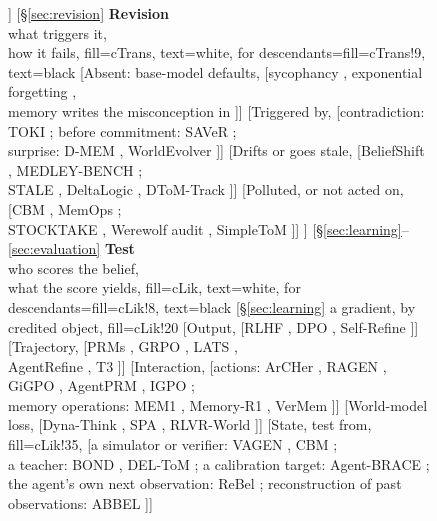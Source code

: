 \begin{figure}[t]
{{  ]
  [{\S\ref*{sec:revision} \textbf{Revision}\\what triggers it,\\how it fails}, fill=cTrans, text=white, for descendants={fill=cTrans!9, text=black}
    [{Absent: base-model defaults}, [{sycophancy \citep{sharma2023towards,atwell2025basil}, exponential forgetting \citep{zhang2025large},\\memory writes the misconception in \citep{bensal2026recalling}}]]
    [{Triggered by}, [{contradiction: TOKI \citep{wang2026toki}; before commitment: SAVeR \citep{yuan2026verify};\\surprise: D-MEM \citep{song2026d}, WorldEvolver \citep{zhang2026selfevolvingx}}]]
    [{Drifts or goes stale}, [{BeliefShift \citep{myakala2026beliefshift}, MEDLEY-BENCH \citep{abtahi2026medleybench};\\STALE \citep{chao2026stale}, DeltaLogic \citep{dhanda2026deltalogic}, DToM-Track \citep{nguyen2026dynamic}}]]
    [{Polluted, or not acted on}, [{CBM \citep{xu2026should}, MemOps \citep{hao2026memops};\\STOCKTAKE \citep{deb2026stocktake}, Werewolf audit \citep{gao2026auditing}, SimpleToM \citep{gu2024simpletom}}]]
  ]
  [{\S\ref*{sec:learning}--\ref*{sec:evaluation} \textbf{Test}\\who scores the belief,\\what the score yields}, fill=cLik, text=white, for descendants={fill=cLik!8, text=black}
    [{\S\ref{sec:learning} a gradient, by credited object}, fill=cLik!20
      [{Output}, [{RLHF \citep{ouyang2022training}, DPO \citep{rafailov2023direct}, Self-Refine \citep{madaan2023self}}]]
      [{Trajectory}, [{PRMs \citep{lightman2023lets}, GRPO \citep{shao2024deepseekmath}, LATS \citep{zhou2023language},\\AgentRefine \citep{fu2025agentrefine}, T3 \citep{zou2025t3}}]]
      [{Interaction}, [{actions: ArCHer \citep{zhou2024archer}, RAGEN \citep{wang2025ragen}, GiGPO \citep{feng2025group}, AgentPRM \citep{xi2025agentprm}, IGPO \citep{wang2025information};\\memory operations: MEM1 \citep{zhou2025mem1}, Memory-R1 \citep{yan2025memory}, VerMem \citep{sun2026verifiable}}]]
      [{World-model loss}, [{Dyna-Think \citep{yu2025dynathink}, SPA \citep{chen2025why}, RLVR-World \citep{wu2025rlvrworld}}]]
      [{State, test from}, fill=cLik!35, [{a simulator or verifier: VAGEN \citep{wang2025vagen}, CBM \citep{xu2026should};\\a teacher: BOND \citep{cui2026distilling}, DEL-ToM \citep{wu2025deltom}; a calibration target: Agent-BRACE \citep{singh2026agent};\\the agent's own next observation: ReBel \citep{tang2026rewarding}; reconstruction of past observations: ABBEL \citep{lidayan2025abbel}}]]
}}
\end{figure}
